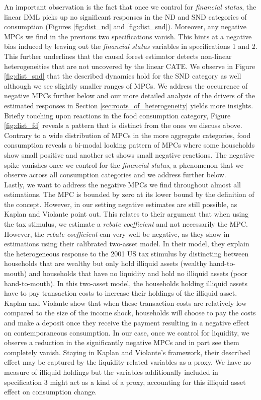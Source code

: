 An important observation is the fact that once we control for \textit{financial status}, the linear DML picks up no significant responses in the ND and SND categories of consumption (Figures \ref{fig:dist_nd} and \ref{fig:dist_snd}). Moreover, any negative MPCs we find in the previous two specifications vanish. This hints at a negative bias induced by leaving out the \textit{financial status} variables in specifications 1 and 2. This further underlines that the causal forest estimator detects non-linear heterogeneities that are not uncovered by the linear CATE. We observe in Figure \ref{fig:dist_snd} that the described dynamics hold for the SND category as well although we see slightly smaller ranges of MPCs. We address the occurrence of negative MPCs further below and our more detailed analysis of the drivers of the estimated responses in Section \ref{sec:roots_of_heterogeneity} yields more insights. \\
Briefly touching upon reactions in the food consumption category, Figure \ref{fig:dist_fd} reveals a pattern that is distinct from the ones we discuss above. Contrary to a wide distribution of MPCs in the more aggregate categories, food consumption reveals a bi-modal looking pattern of MPCs where some households show small positive and another set shows small negative reactions. The negative spike vanishes once we control for the \textit{financial status}, a phenomenon that we observe across all consumption categories and we address further below. \\
Lastly, we want to address the negative MPCs we find throughout almost all estimations. The MPC is bounded by zero at its lower bound by the definition of the concept. However, in our setting negative estimates are still possible, as Kaplan and Violante point out. This relates to their argument that when using the tax stimulus, we estimate a \textit{rebate coefficient} and not necessarily the MPC. However, the \textit{rebate coefficient} can very well be negative, as they show in estimations using their calibrated two-asset model. In their model, they explain the heterogeneous response to the 2001 US tax stimulus by distincting between households that are wealthy but only hold illiquid assets (wealthy hand-to-mouth) and households that have no liquidity and hold no illiquid assets (poor hand-to-mouth). In this two-asset model, the households holding illiquid assets have to pay transaction costs to increase their holdings of the illiquid asset. Kaplan and Violante show that when these transaction costs are relatively low compared to the size of the income shock, households will choose to pay the costs and make a deposit once they receive the payment resulting in a negative effect on contemporaneous consumption. In our case, once we control for liquidity, we observe a reduction in the significantly negative MPCs and in part see them completely vanish. Staying in Kaplan and Violante's framework, their described effect may be captured by the liquidity-related variables as a proxy. We have no measure of illiquid holdings but the variables additionally included in specification 3 might act as a kind of a proxy, accounting for this illiquid asset effect on consumption change. \\
